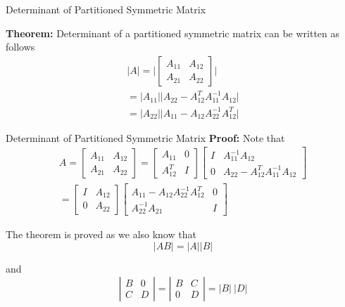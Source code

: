 \documentclass{beamer}
\begin{document}
\begin{frame}{Determinant of Partitioned Symmetric Matrix}
	
\textbf{Theorem:} Determinant of a partitioned symmetric matrix can be written as follows
	\begin{gather}
		\vert A \vert 
		= \bigg| 
		\begin{bmatrix}
			A_{11}&A_{12}\\
			A_{21}&A_{22}
		\end{bmatrix}
		\bigg| \\
		=\vert A_{11}\vert \vert A_{22}-A_{12}^TA_{11}^{-1}A_{12}\vert \\
		=\vert A_{22}\vert \vert
		 A_{11}-A_{12}A_{22}^{-1}A_{12}^T \vert 
	\end{gather}
\end{frame}

\begin{frame}{Determinant of Partitioned Symmetric Matrix}
\textbf{Proof:} Note that
	\begin{gather}
		A = 
		\begin{bmatrix}
			A_{11}&A_{12} \\
			A_{21}&A_{22}
		\end{bmatrix}
		= 
		\begin{bmatrix}
			A_{11}& 0 \\
			A_{12}^T& I
		\end{bmatrix}
		\begin{bmatrix}
			I & A_{11}^{-1}A_{12} \\
			0 & A_{22} - A_{12}^TA_{11}^{-1}A_{12}
		\end{bmatrix}\\
		= 
		\begin{bmatrix}
			I & A_{12} \\
			0 & A_{22}
		\end{bmatrix}
		\begin{bmatrix}
			A_{11} - A_{12}A_{22}^{-1}A_{12}^T & 0\\
			A_{22}^{-1}A_{21}  & I
		\end{bmatrix}
	\end{gather} 
	
The theorem is proved as we also know that
\begin{equation}
	\vert AB\vert=\vert A\vert  \vert B\vert 
\end{equation}

and
\begin{equation}
	\left\vert 
		\begin{matrix}
			B&0 \\
			C&D
		\end{matrix} 
	\right\vert
	=
	\left\vert 
		\begin{matrix}
			B&C \\
			0&D
		\end{matrix} 
	\right\vert
	=
	\vert B\vert\
	\vert D\vert 
\end{equation}	
\end{frame}
\end{document}
